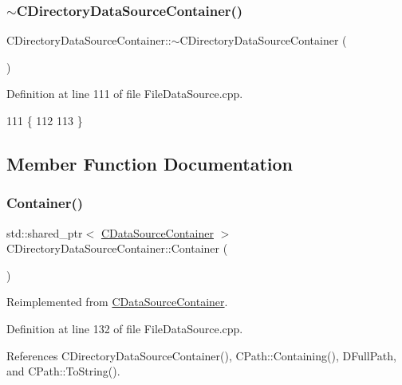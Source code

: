 \subsubsection{\texorpdfstring{$\sim$\+C\+Directory\+Data\+Source\+Container()}{~CDirectoryDataSourceContainer()}}
{\footnotesize\ttfamily C\+Directory\+Data\+Source\+Container\+::$\sim$\+C\+Directory\+Data\+Source\+Container (\begin{DoxyParamCaption}{ }\end{DoxyParamCaption})}



Definition at line 111 of file File\+Data\+Source.\+cpp.


\begin{DoxyCode}
111                                                              \{
112     
113 \}
\end{DoxyCode}


\subsection{Member Function Documentation}
\hypertarget{classCDirectoryDataSourceContainer_a5a498db9b312c223b0816fc6cc1fcd3d}{}\label{classCDirectoryDataSourceContainer_a5a498db9b312c223b0816fc6cc1fcd3d} 
\subsubsection{\texorpdfstring{Container()}{Container()}}
{\footnotesize\ttfamily std\+::shared\+\_\+ptr$<$ \hyperlink{classCDataSourceContainer}{C\+Data\+Source\+Container} $>$ C\+Directory\+Data\+Source\+Container\+::\+Container (\begin{DoxyParamCaption}{ }\end{DoxyParamCaption})\hspace{0.3cm}{\ttfamily [virtual]}}



Reimplemented from \hyperlink{classCDataSourceContainer_a040c80f46e9d2df36b494290a945e61a}{C\+Data\+Source\+Container}.



Definition at line 132 of file File\+Data\+Source.\+cpp.



References C\+Directory\+Data\+Source\+Container(), C\+Path\+::\+Containing(), D\+Full\+Path, and C\+Path\+::\+To\+String().


